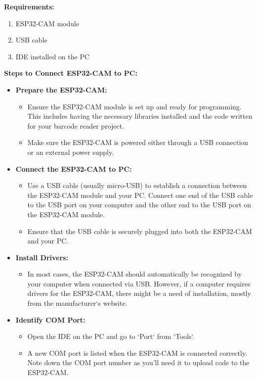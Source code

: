 \bigskip

\textbf{Requirements:}

\begin{enumerate}
    \item ESP32-CAM module
    \item USB cable 
    \item IDE installed on the PC
\end{enumerate}

\textbf{Steps to Connect ESP32-CAM to PC:}

\begin{itemize}
    \item \textbf{Prepare the ESP32-CAM:}
    \begin{itemize}
        \item Ensure the ESP32-CAM module is set up and ready for programming. This includes having the necessary libraries installed and the code written for your barcode reader project.
        \item Make sure the ESP32-CAM is powered either through a USB connection or an external power supply.
    \end{itemize}
    \item \textbf {Connect the ESP32-CAM to PC:}
    \begin{itemize}
        \item Use a USB cable (usually micro-USB) to establish a connection between the ESP32-CAM module and your PC. Connect one end of the USB cable to the USB port on your computer and the other end to the USB port on the ESP32-CAM module.
        \item Ensure that the USB cable is securely plugged into both the ESP32-CAM and your PC.
    \end{itemize}
    \item \textbf {Install Drivers:}
    \begin{itemize}
        \item In most cases, the ESP32-CAM should automatically be recognized by your computer when connected via USB. However, if a computer requires drivers for the ESP32-CAM, there might be a need of installation, mostly from the manufacturer`s website.
    \end{itemize}
    \item \textbf {Identify COM Port:}
    \begin{itemize}
        \item Open the IDE on the PC and go to `Port` from `Tools`. 
        \item A new COM port is listed when the ESP32-CAM is connected correctly. Note down the COM port number as you'll need it to upload code to the ESP32-CAM.

\end{itemize}
\end{itemize}
